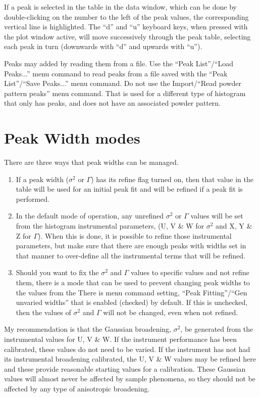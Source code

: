 If a peak is selected in the table in the data window, which can be done by double-clicking on the number to the left of the peak values, the corresponding vertical line is highlighted. The ``d'' and ``u'' keyboard keys, when pressed with the plot window active, will  move successively through the peak table, selecting each peak in turn (downwards with ``d'' and upwards with ``u'').  

Peaks may added by reading them from a file. Use the ``Peak List''/``Load Peaks...'' menu command to read peaks from a file saved with the ``Peak List''/``Save Peaks...'' menu command. Do not use the  Import/``Read powder pattern peaks'' menu command. That is used for a different type of histogram that only has peaks, and does not have an associated powder pattern. 

\section{Peak Width modes}\label{ref:widthmode}
There are three ways that peak widths can be managed. 
\begin{enumerate}
    \item If a peak width ($\sigma^2$ or $\Gamma$) has its refine flag turned on, then that value in the table will be used for an initial peak fit and will be refined if a peak fit is performed. 
    \item In the default mode of operation, any unrefined $\sigma^2$ or $\Gamma$ values will be set from the histogram instrumental parameters, (U, V \& W for $\sigma^2$ and X, Y \& Z for $\Gamma$). When this is done, it is possible to refine those instrumental parameters, but make sure that there are enough peaks with widths set in that manner to over-define all the instrumental terms that will be refined.
    \item Should you want to fix the $\sigma^2$ and $\Gamma$ values to specific values and not refine them, there is a mode that can be used to prevent changing peak widths to the values from the There is menu command setting,  ``Peak Fitting''/``Gen unvaried widths'' that is enabled (checked) by default. If this is unchecked, then the values of $\sigma^2$ and $\Gamma$ will not be changed, even when not refined. 
\end{enumerate}

My recommendation is that the Gaussian broadening,  $\sigma^2$, be generated from the instrumental values for U, V \& W. If the instrument performance has been calibrated, these values do not need to be varied. If the instrument has not had its instrumental broadening calibrated, the U, V \& W values may be refined here and these provide reasonable starting values for a calibration.  These Gaussian values will almost never be affected by sample phenomena, so they should not be affected by any type of anisotropic broadening. 

